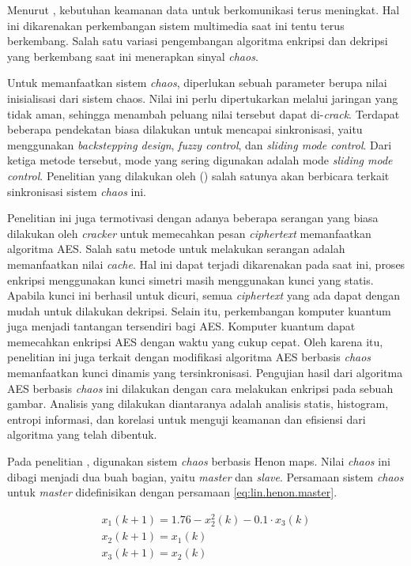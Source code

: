 Menurut \textcite{lin2021}, kebutuhan keamanan data untuk berkomunikasi terus meningkat. Hal ini dikarenakan perkembangan sistem multimedia saat ini tentu terus berkembang. Salah satu variasi pengembangan algoritma enkripsi dan dekripsi yang berkembang saat ini menerapkan sinyal \emph{chaos}. 

Untuk memanfaatkan sistem \emph{chaos}, diperlukan sebuah parameter berupa nilai inisialisasi dari sistem chaos. Nilai ini perlu dipertukarkan melalui jaringan yang tidak aman, sehingga menambah peluang nilai tersebut dapat di-\emph{crack}. Terdapat beberapa pendekatan biasa dilakukan untuk mencapai sinkronisasi, yaitu menggunakan \emph{backstepping design}, \emph{fuzzy control}, dan \emph{sliding mode control}. Dari ketiga metode tersebut, mode yang sering digunakan adalah mode \emph{sliding mode control}. Penelitian yang dilakukan oleh (\cite{lin2021}) salah satunya akan berbicara terkait sinkronisasi sistem \emph{chaos} ini.

Penelitian ini juga termotivasi dengan adanya beberapa serangan yang biasa dilakukan oleh \emph{cracker} untuk memecahkan pesan \emph{ciphertext} memanfaatkan algoritma AES. Salah satu metode untuk melakukan serangan adalah memanfaatkan nilai \emph{cache}. Hal ini dapat terjadi dikarenakan pada saat ini, proses enkripsi menggunakan kunci simetri masih menggunakan kunci yang statis. Apabila kunci ini berhasil untuk dicuri, semua \emph{ciphertext} yang ada dapat dengan mudah untuk dilakukan dekripsi. Selain itu, perkembangan komputer kuantum juga menjadi tantangan tersendiri bagi AES. Komputer kuantum dapat memecahkan enkripsi AES dengan waktu yang cukup cepat. Oleh karena itu, penelitian ini juga terkait dengan modifikasi algoritma AES berbasis \emph{chaos} memanfaatkan kunci dinamis yang tersinkronisasi. Pengujian hasil dari algoritma AES berbasis \emph{chaos} ini dilakukan dengan cara melakukan enkripsi pada sebuah gambar. Analisis yang dilakukan diantaranya adalah analisis statis, histogram, entropi informasi, dan korelasi untuk menguji keamanan dan efisiensi dari algoritma yang telah dibentuk.

Pada penelitian \textcite{lin2021}, digunakan sistem \emph{chaos} berbasis Henon maps. Nilai \emph{chaos} ini dibagi menjadi dua buah bagian, yaitu \emph{master} dan \emph{slave}. Persamaan sistem \emph{chaos} untuk \emph{master} didefinisikan dengan persamaan \ref{eq:lin.henon.master}.

\begin{equation}
  \label{eq:lin.henon.master}
  \begin{array}{l}   
    x_1(k+1) = 1.76 - x_2^2(k) - 0.1 \cdot x_3(k)\\
    x_2(k+1) = x_1(k)\\
    x_3(k+1) = x_2(k)
  \end{array}
\end{equation}

